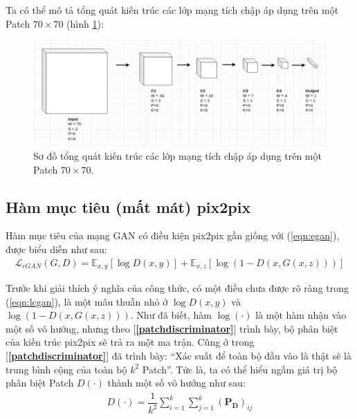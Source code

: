 \documentclass[a4paper, 12pt]{report}
\begin{document}
Ta có thể mô tả tổng quát kiến trúc các lớp mạng tích chập áp dụng trên một Patch $70 \times 70$ (hình \ref{fig:dis70pix2pix}):

\begin{figure}[!h]
\captionsetup{width=0.8\textwidth}
\centering
\includegraphics[width=16cm]{images/dis70pix2pix.png}
\caption{Sơ đồ tổng quát kiến trúc các lớp mạng tích chập áp dụng trên một Patch $70 \times 70$.}
\label{fig:dis70pix2pix}
\end{figure}

\subsection{Hàm mục tiêu (mất mát) pix2pix}\label{objofpix2pix}

Hàm mục tiêu của mạng GAN có điều kiện pix2pix gần giống với (\ref{eqn:egan}), được biểu diễn như sau:
\begin{align}
    \mathcal{L}_{cGAN}\left(G, D\right) = \mathbb{E}_{x, y}\left[\log D\left(x, y\right)\right] + \mathbb{E}_{x, z}\left[\log\left(1-D\left(x, G\left(x, z\right)\right)\right)\right]\label{eqn:lcgan}
\end{align}

Trước khi giải thích ý nghĩa của công thức, có một điều chưa được rõ ràng trong (\ref{eqn:lcgan}), là một mâu thuẫn nhỏ ở $\log D\left(x, y\right)$ và $\log\left(1-D\left(x, G\left(x, z\right)\right)\right)$.
Như đã biết, hàm $\log\left(\cdot\right)$ là một hàm nhận vào một số vô hướng, nhưng theo [\textbf{\ref{patchdiscriminator}}] trình bày, bộ phân biệt của kiến trúc pix2pix sẽ trả ra một ma trận.
Cũng ở trong [\textbf{\ref{patchdiscriminator}}] đã trình bày: ``Xác suất để toàn bộ đầu vào là thật sẽ là trung bình cộng của toàn bộ $k^2$ Patch''.
Tức là, ta có thể hiểu ngầm giá trị bộ phân biệt Patch $D\left(\cdot\right)$ thành một số vô hướng như sau:
\begin{align}
    D\left(\cdot\right) = \dfrac{1}{k^2}\sum_{i=1}^{k}\sum_{j=1}^{k}\left(\mathbf{P_D}\right)_{ij} \label{eqn:aliaslogD}
\end{align}
\end{document}
